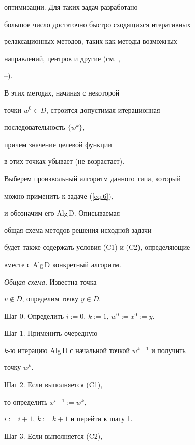 оптимизации. Для таких задач разработано


большое число достаточно быстро сходящихся итеративных


релаксационных методов, таких как методы возможных


направлений, центров и другие (см. \cite{Zoi63},


\cite{Pol74}--\cite{Kiw85}).


 В этих методах, начиная с некоторой


точки $w^{0} \in D$, строится допустимая итерационная


последовательность $\{ w^{k}\}$,


причем значение целевой функции


в этих точках убывает (не возрастает).


Выберем произвольный алгоритм данного типа, который


можно применить к задаче (\ref{eq:6}),


и обозначим его Alg\,D. Описываемая


общая схема методов решения исходной задачи


будет также содержать условия (C1) и (C2), определяющие


вместе с Alg\,D конкретный алгоритм.


\medskip





{\it Общая схема.} Известна точка


$v\notin D$, определим точку $y\in D$.





Шаг 0. Определить $i:=0$, $k:=1$, $w^{0}:=x^{0}:=y$.





Шаг 1. Применить очередную


$k$-ю итерацию Alg\,D с начальной точкой $w^{k-1}$ и получить


точку $w^{k}$.





Шаг 2. Если выполняется (C1),


то определить $x^{i+1}:=w^{k}$,


$i:=i+1$, $k:=k+1$ и перейти к шагу 1.





Шаг 3. Если выполняется (C2),


